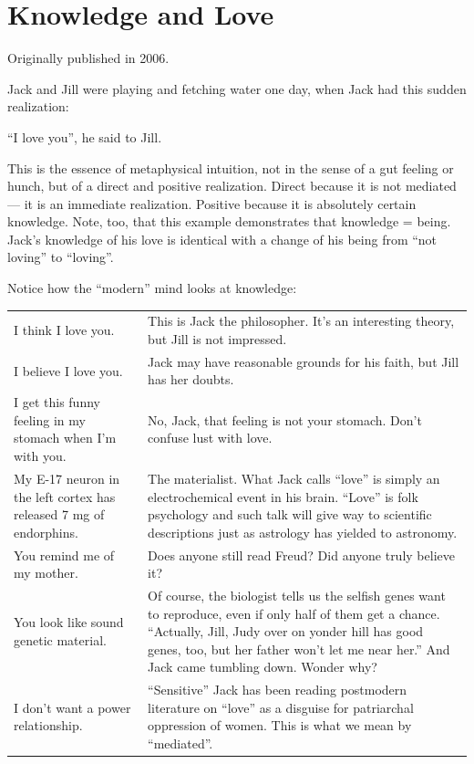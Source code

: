 \section{Knowledge and Love}

Originally published in 2006.

Jack and Jill were playing and fetching water one day, when Jack had this sudden realization:

``I love you'', he said to Jill.

This is the essence of metaphysical intuition, not in the sense of a gut feeling or hunch, but of a direct and positive realization. Direct because it is not mediated --- it is an immediate realization. Positive because it is absolutely certain knowledge. Note, too, that this example demonstrates that knowledge = being. Jack's knowledge of his love is identical with a change of his being from ``not loving'' to ``loving''.

Notice how the ``modern'' mind looks at knowledge:
{\small
\begin{longtable}{p{}p{}}
	\toprule
	I think I love you. &
	This is Jack the philosopher. It's an interesting theory, but Jill is not impressed.\\
	
	I believe I love you. &
	Jack may have reasonable grounds for his faith, but Jill has her doubts.\\
	
	I get this funny feeling in my stomach when I'm with you. &
	No, Jack, that feeling is not your stomach. Don't confuse lust with love.\\
	
	My E-17 neuron in the left cortex has released 7 mg of endorphins. &
	The materialist. What Jack calls ``love'' is simply an electrochemical event in his brain. ``Love'' is folk psychology and such talk will give way to scientific descriptions just as astrology has yielded to astronomy.\\
	
	You remind me of my mother. &
	Does anyone still read Freud? Did anyone truly believe it?\\
	
	You look like sound genetic material. &
	Of course, the biologist tells us the selfish genes want to reproduce, even if only half of them get a chance. ``Actually, Jill, Judy over on yonder hill has good genes, too, but her father won't let me near her.'' And Jack came tumbling down. Wonder why?\\
	
	I don't want a power relationship. &
	``Sensitive'' Jack has been reading postmodern literature on ``love'' as a disguise for patriarchal oppression of women. This is what we mean by ``mediated''.\\
	\bottomrule
\end{longtable}}

